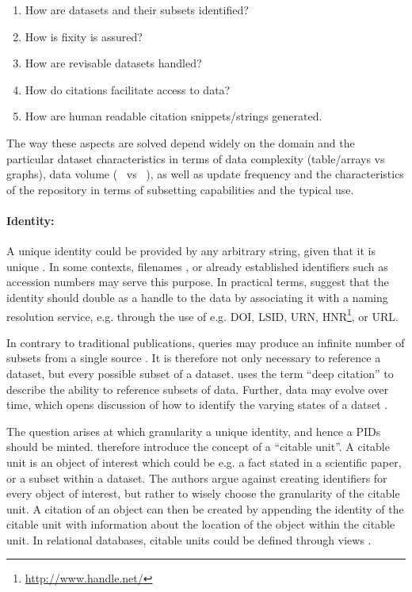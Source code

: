 \documentclass[letterpaper, parskip=half]{scrartcl}
\begin{document}
\begin{enumerate}
 \item How are datasets and their subsets identified? 
 \item How is fixity is assured? 
 \item How are revisable datasets handled? 
 \item How do citations facilitate access to data? 
 \item How are human readable citation snippets/strings generated.
\end{enumerate}

The way these aspects are solved depend widely on the domain and the particular dataset characteristics in terms of data complexity (table/arrays vs graphs), data volume (\si{\kilo\byte} vs \si{\peta\byte}), as well as update frequency and the characteristics of the repository in terms of subsetting capabilities and the typical use.

\paragraph{Identity:}
A unique identity could be provided by any arbitrary string, given that it is unique \citep{CODATA2013}. In some contexts, filenames \citep{Buneman2016}, or already established identifiers such as accession numbers \citep{Bandrowski2016} may serve this purpose. 
In practical terms, \cite{AltKin07} suggest that the identity should double as a handle to the data by associating it with a naming resolution service, e.g. through the use of e.g. \gls{DOI},  \gls{LSID}, \gls{URN}, \gls{HNR}\footnote{\url{http://www.handle.net/}}, or \gls{URL}. 

In contrary to traditional publications, queries may produce an infinite number of subsets from a single source \citep{Davidson2017, CODATA2013}. It is therefore not only necessary to reference a dataset, but every possible subset of a dataset. \cite{AltKin07} uses the term ``deep citation'' to describe the ability to reference subsets of data. 
Further, data may evolve over time, which opens discussion of how to identify the varying states of a datset \citep{Huber2015}.

The question arises at which granularity a unique identity, and hence a \glspl{PID} should be minted. \cite{Buneman2010} therefore introduce the concept of a ``citable unit''. A citable unit is an object of interest which could be e.g. a fact stated in a scientific paper, or a subset within a dataset. The authors argue against creating identifiers for every object of interest, but rather to wisely choose the granularity of the citable unit. A citation of an object can then be created by appending the identity of the citable unit with information about the location of the object within the citable unit. In relational databases, citable units could be defined through views \citep{Buneman2016}.
\end{document}
